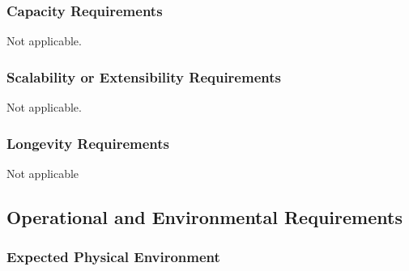 \documentclass[12pt, titlepage]{article}
\begin{document}
\subsubsection{Capacity Requirements}
Not applicable.
\subsubsection{Scalability or Extensibility Requirements}
Not applicable.
\subsubsection{Longevity Requirements}
Not applicable

\subsection{Operational and Environmental Requirements}

\subsubsection{Expected Physical Environment}
\end{document}
